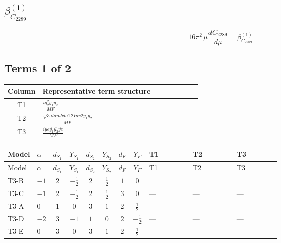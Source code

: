 \documentclass[8pt]{article}
\begin{document}
\begin{landscape}
\section*{$\beta_{C_{2289}}^{(1)}$}
\[16\pi^2\,\mu\frac{d C_{2289}}{d\mu}=\beta_{C_{2289}}^{(1)}\]
\subsection*{Terms 1 of 2}
\begin{center}
\begin{tabular}{@{}c >{\raggedright\arraybackslash}p{0.82\linewidth}@{}}
\toprule
Column & Representative term structure \\
\midrule
T1 & \(\displaystyle \frac{i g_{2}^{2} \overline{y_{1}} \overline{y_{2}}}{MF}\) \\
\midrule
T2 & \(\displaystyle \frac{\sqrt{3} i lambda12Inv2 \overline{y_{1}} \overline{y_{2}}}{MF}\) \\
\midrule
T3 & \(\displaystyle \frac{i ye \overline{y_{1}} \overline{y_{2}} \overline{ye}}{MF}\) \\
\midrule
\bottomrule
\end{tabular}
\end{center}
\smallskip
\tiny
\begin{longtable}{@{}llcccccc >{\raggedright\arraybackslash}p{0.21\linewidth} >{\raggedright\arraybackslash}p{0.21\linewidth} >{\raggedright\arraybackslash}p{0.21\linewidth}@{}}
\toprule
Model & $\alpha$ & $d_{S_1}$ & $Y_{S_1}$ & $d_{S_2}$ & $Y_{S_2}$ & $d_F$ & $Y_F$ & T1 & T2 & T3 \\
\midrule
\endfirsthead
\toprule
Model & $\alpha$ & $d_{S_1}$ & $Y_{S_1}$ & $d_{S_2}$ & $Y_{S_2}$ & $d_F$ & $Y_F$ & T1 & T2 & T3 \\
\midrule
\endhead
T3-B & $-1$ & $2$ & $-\frac{1}{2}$ & $2$ & $\frac{1}{2}$ & $1$ & $0$ & \scriptsize\adjustbox{max width=\linewidth}{$\begin{gathered} - \frac{3 i g_{2}^{2} \overline{y_{1}} \overline{y_{2}}}{4 MF}\end{gathered}$} & \scriptsize\adjustbox{max width=\linewidth}{$\begin{gathered} - \frac{\sqrt{3} i lambda12Inv2 \overline{y_{1}} \overline{y_{2}}}{3 MF}\end{gathered}$} & \scriptsize\adjustbox{max width=\linewidth}{$\begin{gathered} \frac{i ye \overline{y_{1}} \overline{y_{2}} \overline{ye}}{4 MF}\end{gathered}$} \\
\midrule
T3-C & $-1$ & $2$ & $-\frac{1}{2}$ & $2$ & $\frac{1}{2}$ & $3$ & $0$ & --- & --- & --- \\
\midrule
T3-A & $0$ & $1$ & $0$ & $3$ & $1$ & $2$ & $\frac{1}{2}$ & --- & --- & --- \\
\midrule
T3-D & $-2$ & $3$ & $-1$ & $1$ & $0$ & $2$ & $-\frac{1}{2}$ & --- & --- & --- \\
\midrule
T3-E & $0$ & $3$ & $0$ & $3$ & $1$ & $2$ & $\frac{1}{2}$ & --- & --- & --- \\
\midrule
\bottomrule
\end{longtable}
\clearpage

\end{landscape}
\end{document}
